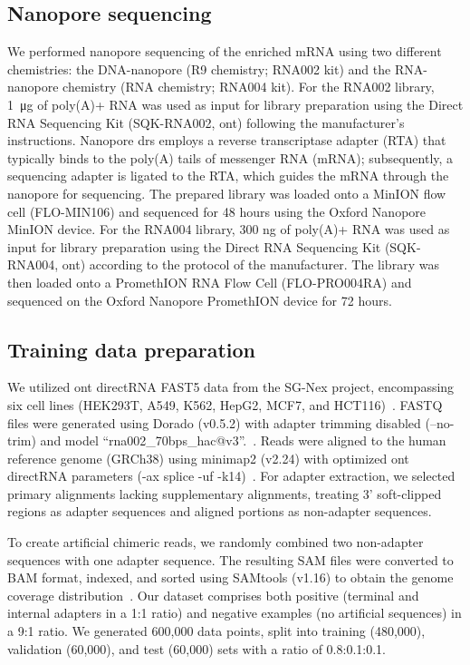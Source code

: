 \documentclass[pdflatex, sn-mathphys-num, lineno]{sn-jnl}%
\theoremstyle{thmstyleone}%
\theoremstyle{thmstyletwo}%
\theoremstyle{thmstylethree}%
\begin{document}
\subsection{Nanopore sequencing}

We performed nanopore sequencing of the enriched mRNA using two different chemistries: the DNA-nanopore (R9 chemistry; RNA002 kit) and the RNA-nanopore chemistry (RNA chemistry; RNA004 kit).
For the RNA002 library, \SI{1}{\micro\gram} of poly(A)+ RNA was used as input for library preparation using the Direct RNA Sequencing Kit (SQK-RNA002, \gls{ont}) following the manufacturer's instructions.
Nanopore \gls{drs} employs a reverse transcriptase adapter (RTA) that typically binds to the poly(A) tails of messenger RNA (mRNA); subsequently, a sequencing adapter is ligated to the RTA, which guides the mRNA through the nanopore for sequencing.
The prepared library was loaded onto a MinION flow cell (FLO-MIN106) and sequenced for 48 hours using the Oxford Nanopore MinION device.
For the RNA004 library, 300 ng of poly(A)+ RNA was used as input for library preparation using the Direct RNA Sequencing Kit (SQK-RNA004, \gls{ont}) according to the protocol of the manufacturer.
The library was then loaded onto a PromethION RNA Flow Cell (FLO-PRO004RA) and sequenced on the Oxford Nanopore PromethION device for 72 hours.

\subsection{Training data preparation}\label{ssec:data}

We utilized \gls{ont} directRNA FAST5 data from the SG-Nex project, encompassing six cell lines (HEK293T, A549, K562, HepG2, MCF7, and HCT116)~\cite{chen2021systematic}.
FASTQ files were generated using Dorado (v0.5.2) with adapter trimming disabled (--no-trim) and  model “rna002\_70bps\_hac@v3”.~\cite{dorado2023}.
Reads were aligned to the human reference genome (GRCh38) using minimap2 (v2.24) with optimized \gls{ont} directRNA parameters (-ax splice -uf -k14)~\cite{li2018minimap2}.
For adapter extraction, we selected primary alignments lacking supplementary alignments, treating 3' soft-clipped regions as adapter sequences and aligned portions as non-adapter sequences.

To create artificial chimeric reads, we randomly combined two non-adapter sequences with one adapter sequence.
The resulting SAM files were converted to BAM format, indexed, and sorted using SAMtools (v1.16) to obtain the genome coverage distribution~\cite{li2009sequence}.
Our dataset comprises both positive (terminal and internal adapters in a 1:1 ratio) and negative examples (no artificial sequences) in a 9:1 ratio.
We generated 600,000 data points, split into training (480,000), validation (60,000), and test (60,000) sets with a ratio of 0.8:0.1:0.1.
\end{document}
